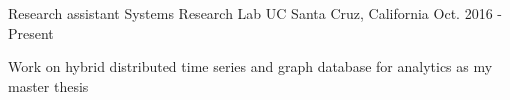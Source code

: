 

\begin{cventries}

  \cventry
    {Research assistant} %
    {Systems Research Lab} %
    {UC Santa Cruz, California} %
    {Oct. 2016 - Present} %
    {
      \begin{cvitems} %
        \item {Work on hybrid distributed time series and graph database for analytics as my master thesis}
      \end{cvitems}
    }

\end{cventries}

